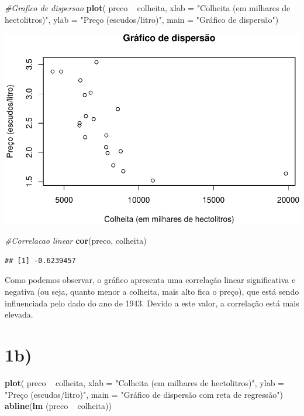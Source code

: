 \documentclass[11pt,]{article}
\makeatletter
\newenvironment{Shaded}{\begin{snugshade}}{\end{snugshade}}
\newcommand{\KeywordTok}[1]{\textcolor[rgb]{0.13,0.29,0.53}{\textbf{{#1}}}}
\newcommand{\DataTypeTok}[1]{\textcolor[rgb]{0.13,0.29,0.53}{{#1}}}
\newcommand{\StringTok}[1]{\textcolor[rgb]{0.31,0.60,0.02}{{#1}}}
\newcommand{\CommentTok}[1]{\textcolor[rgb]{0.56,0.35,0.01}{\textit{{#1}}}}
\newcommand{\NormalTok}[1]{{#1}}
\def\maxwidth{\ifdim\Gin@nat@width>\linewidth\linewidth
\else\Gin@nat@width\fi}
\let\Oldincludegraphics\includegraphics
\renewcommand{\includegraphics}[1]{\Oldincludegraphics[width=\maxwidth]{#1}}
\makeatother
\begin{document}
\begin{Shaded}
\begin{Highlighting}[]
\CommentTok{#Grafico de dispersao}
\KeywordTok{plot}\NormalTok{( preco ~}\StringTok{ }\NormalTok{colheita, }
      \DataTypeTok{xlab =} \StringTok{"Colheita (em milhares de hectolitros)"}\NormalTok{,}
      \DataTypeTok{ylab =} \StringTok{"Preço (escudos/litro)"}\NormalTok{,}
      \DataTypeTok{main =} \StringTok{"Gráfico de dispersão"}\NormalTok{)}
\end{Highlighting}
\end{Shaded}

\includegraphics{versaofinal_lista3_files/figure-latex/unnamed-chunk-2-1.pdf}

\begin{Shaded}
\begin{Highlighting}[]
\CommentTok{#Correlacao linear }
\KeywordTok{cor}\NormalTok{(preco, colheita)}
\end{Highlighting}
\end{Shaded}

\begin{verbatim}
## [1] -0.6239457
\end{verbatim}

Como podemos observar, o gráfico apresenta uma correlação linear
significativa e negativa (ou seja, quanto menor a colheita, mais alto
fica o preço), que está sendo influenciada pelo dado do ano de 1943.
Devido a este valor, a correlação está mais elevada.

\section{1b)}\label{b}

\begin{Shaded}
\begin{Highlighting}[]
\KeywordTok{plot}\NormalTok{( preco ~}\StringTok{ }\NormalTok{colheita, }
      \DataTypeTok{xlab =} \StringTok{"Colheita (em milhares de hectolitros)"}\NormalTok{,}
      \DataTypeTok{ylab =} \StringTok{"Preço (escudos/litro)"}\NormalTok{,}
      \DataTypeTok{main =} \StringTok{"Gráfico de dispersão com reta de regressão"}\NormalTok{)}
\KeywordTok{abline}\NormalTok{(}\KeywordTok{lm} \NormalTok{(preco ~}\StringTok{ }\NormalTok{colheita))}
\end{Highlighting}
\end{Shaded}
\end{document}
